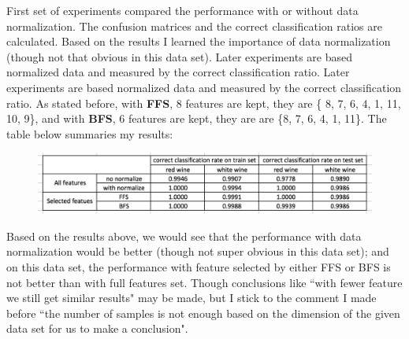 \documentclass[a4paper]{article}
\begin{document}
\begin{spacing}{2.0}
\begin{enumerate}[(1)]
First set of experiments compared the performance with or without data normalization. The confusion matrices and the correct classification ratios are calculated. Based on the results I learned the importance of data normalization (though not that obvious in this data set). Later experiments are based normalized data and measured by the correct classification ratio. Later experiments are based normalized data and measured by the correct classification ratio. As stated before, with \textbf{FFS}, 8 features are kept, they are \{ 8, 7, 6, 4, 1, 11, 10, 9\}, and with \textbf{BFS}, 6 features are kept, they are are \{8, 7, 6, 4, 1, 11\}. The table below summaries my results:
\begin{figure}[H]
\centering
\includegraphics[width = 6in]{allresult.jpg}
\end{figure}
Based on the results above, we would see that the performance with data normalization would be better (though not super obvious in this data set); and on this data set, the performance with feature selected by either FFS or BFS is not better than with full features set. Though conclusions like ``with fewer feature we still get similar results" may be made, but I stick to the comment I made before ``the number of samples is not enough based on the dimension of the given data set for us to make a conclusion". 

\end{enumerate}

\newpage

\end{spacing}
\end{document}
